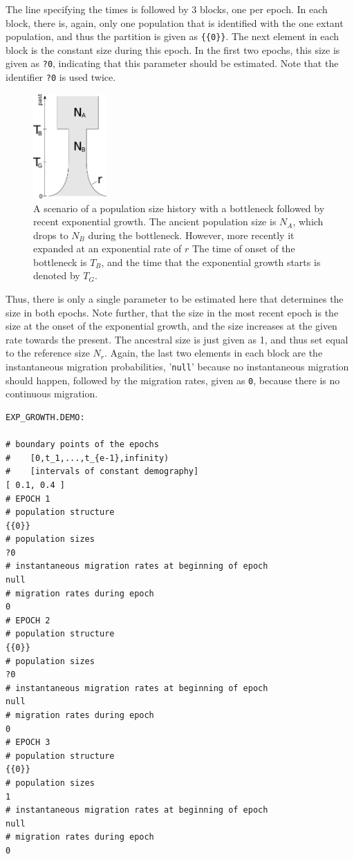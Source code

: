 \documentclass{article}
\numberwithin{equation}{section}
\begin{document}
The line specifying the times is followed by 3 blocks, one per epoch. In each block, there is, again, only one population that is identified with the one extant population, and thus the partition is given as \texttt{\{\{0\}\}}. The next element in each block is the constant size during this epoch. In the first two epochs, this size is given as \texttt{?0}, indicating that this parameter should be estimated. Note that the identifier \texttt{?0} is used twice.
\begin{figure}
  \begin{center}
    \includegraphics[width=0.25\textwidth]{graphics/exp.pdf}
  \end{center} 
  \caption{A scenario of a population size history with a bottleneck followed by recent exponential growth. The ancient population size is $N_A$, which drops to $N_B$ during the bottleneck. However, more recently it expanded at an exponential rate of $r$ The time of onset of the bottleneck is $T_B$, and the time that the exponential growth starts is denoted by $T_G$.}
  \label{fig_exp_growth}
\end{figure}
Thus, there is only a single parameter to be estimated here that determines the size in both epochs. Note further, that the size in the most recent epoch is the size at the onset of the exponential growth, and the size increases at the given rate towards the present. The ancestral size is just given as 1, and thus set equal to the reference size $N_r$. Again, the last two elements in each block are the instantaneous migration probabilities, '\texttt{null}' because no instantaneous migration should happen, followed by the migration rates, given as \texttt{0}, because there is no continuous migration.

\begin{verbatim}
EXP_GROWTH.DEMO:

# boundary points of the epochs
#    [0,t_1,...,t_{e-1},infinity)
#    [intervals of constant demography]
[ 0.1, 0.4 ]
# EPOCH 1
# population structure
{{0}}
# population sizes
?0
# instantaneous migration rates at beginning of epoch
null
# migration rates during epoch
0
# EPOCH 2
# population structure
{{0}}
# population sizes
?0
# instantaneous migration rates at beginning of epoch
null
# migration rates during epoch
0
# EPOCH 3
# population structure
{{0}}
# population sizes
1
# instantaneous migration rates at beginning of epoch
null
# migration rates during epoch
0
\end{verbatim}
\end{document}
